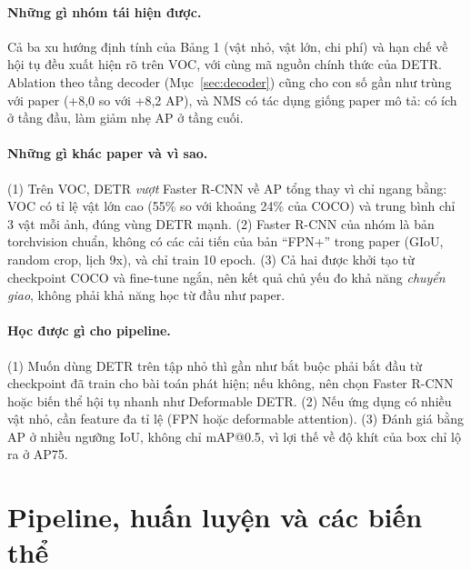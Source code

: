 \documentclass[11pt, a4paper]{article}
\begin{document}
\paragraph{Những gì nhóm tái hiện được.} Cả ba xu hướng định tính của Bảng 1 (vật nhỏ, vật lớn, chi phí) và hạn chế về hội tụ đều xuất hiện rõ trên VOC, với cùng mã nguồn chính thức của DETR. Ablation theo tầng decoder (Mục~\ref{sec:decoder}) cũng cho con số gần như trùng với paper (+8,0 so với +8,2 AP), và NMS có tác dụng giống paper mô tả: có ích ở tầng đầu, làm giảm nhẹ AP ở tầng cuối.

\paragraph{Những gì khác paper và vì sao.} (1) Trên VOC, DETR \emph{vượt} Faster R-CNN về AP tổng thay vì chỉ ngang bằng: VOC có tỉ lệ vật lớn cao (55\% so với khoảng 24\% của COCO) và trung bình chỉ 3 vật mỗi ảnh, đúng vùng DETR mạnh. (2) Faster R-CNN của nhóm là bản torchvision chuẩn, không có các cải tiến của bản ``FPN+'' trong paper (GIoU, random crop, lịch 9x), và chỉ train 10 epoch. (3) Cả hai được khởi tạo từ checkpoint COCO và fine-tune ngắn, nên kết quả chủ yếu đo khả năng \emph{chuyển giao}, không phải khả năng học từ đầu như paper.

\paragraph{Học được gì cho pipeline.} (1) Muốn dùng DETR trên tập nhỏ thì gần như bắt buộc phải bắt đầu từ checkpoint đã train cho bài toán phát hiện; nếu không, nên chọn Faster R-CNN hoặc biến thể hội tụ nhanh như Deformable DETR. (2) Nếu ứng dụng có nhiều vật nhỏ, cần feature đa tỉ lệ (FPN hoặc deformable attention). (3) Đánh giá bằng AP ở nhiều ngưỡng IoU, không chỉ mAP@0.5, vì lợi thế về độ khít của box chỉ lộ ra ở AP75.

\section{Pipeline, huấn luyện và các biến thể}
\end{document}
